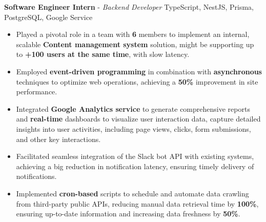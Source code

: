 \documentclass[a4paper,10pt]{article}
\begin{document}
\textbf{Software Engineer Intern} - \textit{Backend Developer} \hfill TypeScript, NestJS, Prisma, PostgreSQL, Google Service
\begin{itemize}[noitemsep, topsep=0pt, partopsep=0pt, parsep=0pt]
    \item Played a pivotal role in a team with \textbf{6} members to implement an internal, scalable \textbf{Content management system} solution, might be supporting up to \textbf{+100 users at the same time}, with slow latency.
    \item Employed \textbf{event-driven programming} in combination with \textbf{asynchronous} techniques to optimize web operations, achieving a \textbf{50\%} improvement in site performance. 
    \item Integrated \textbf{Google Analytics service} to generate comprehensive reports and \textbf{real-time} dashboards to visualize user interaction data, capture detailed insights into user activities, including page views, clicks, form submissions, and other key interactions.
    \item Facilitated seamless integration of the Slack bot API with existing systems, achieving a big reduction in notification latency, ensuring timely delivery of notifications.
    \item Implemented \textbf{cron-based} scripts to schedule and automate data crawling from third-party public APIs, reducing manual data retrieval time by \textbf{100\%}, ensuring up-to-date information and increasing data freshness by \textbf{50\%}.
\end{itemize}



\end{document}
